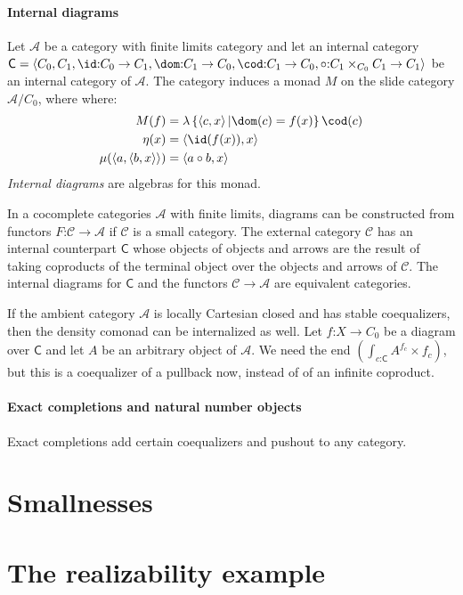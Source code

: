 \documentclass{tac}
\newcommand\hide[1]{}
\newcommand\cat\mathcal
\newcommand\icat\mathsf
\newcommand\of{\mathord:}
\newcommand\set[1]{\left\{#1\right\}}
\newcommand\tuplet[1]{\left\langle #1 \right\rangle}
\begin{document}
\paragraph{Internal diagrams}
\begin{definition} Let $\cat A$ be a category with finite limits category and let an internal category $\icat C = \tuplet{C_0,C_1,\id\of C_0\to C_1,\dom\of C_1\to C_0,\cod\of C_1\to C_0,\circ\of C_1\times_{C_0}C_1\to C_1}$ be an internal category of $\cat A$. 
The category induces a monad $M$ on the slide category $\cat A/C_0$, where where:
\begin{align*}
M(f) &= \lambda\set{\tuplet{c,x}| \dom(c)=f(x)}\cod(c) \\
\eta(x) &= \tuplet{\id(f(x)),x}\\
\mu(\tuplet{a,\tuplet{b,x}}) &= \tuplet{a\circ b,x}
\end{align*}
\emph{Internal diagrams} are algebras for this monad.
\end{definition}

\begin{example}
In a cocomplete categories $\cat A$ with finite limits, diagrams can be constructed from functors $F\of\cat C\to\cat A$ if $\cat C$ is a small category. The external category $\cat C$ has an internal counterpart $\icat C$ whose objects of objects and arrows are the result of taking coproducts of the terminal object over the objects and arrows of $\cat C$. The internal diagrams for $\icat C$ and the functors $\cat C\to \cat A$ are equivalent categories.
\end{example}

If the ambient category $\cat A$ is locally Cartesian closed and has stable coequalizers, then the density comonad can be internalized as well. Let $f\of X\to C_0$ be a diagram over $\icat C$ and let $A$ be an arbitrary object of $\cat A$. We need the end $\left(\int_{c\of \icat C}A^{f_c}\times f_c\right)$, but this is a coequalizer of a pullback now, instead of of an infinite coproduct.

\paragraph{Exact completions and natural number objects}
Exact completions add certain coequalizers and pushout to any category. 


\hide{
collect requirements:
- lccc for the internalized density comonads
- pushouts
- internalized smallness
}

\section{Smallnesses}
\hide{
- nno's cycles & horns
- W-types
-	etc.
}
\section{The realizability example}
\hide{
- simplicial assemblies & modest sets.
- exact completions for pushouts.
- exact completions as examples of homotopy categories.
}
\end{document}
